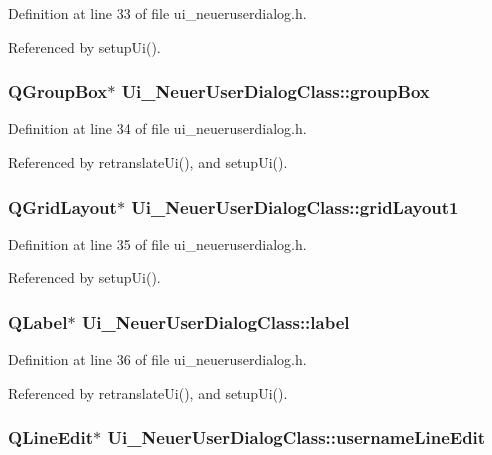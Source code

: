 Definition at line 33 of file ui\_\-neueruserdialog.h.

Referenced by setupUi().\hypertarget{class_ui___neuer_user_dialog_class_b9f51227b66d41b825f04bfccdf9168f}{
\subsubsection[groupBox]{\setlength{\rightskip}{0pt plus 5cm}QGroupBox$\ast$ {\bf Ui\_\-NeuerUserDialogClass::groupBox}}}
\label{class_ui___neuer_user_dialog_class_b9f51227b66d41b825f04bfccdf9168f}




Definition at line 34 of file ui\_\-neueruserdialog.h.

Referenced by retranslateUi(), and setupUi().\hypertarget{class_ui___neuer_user_dialog_class_3b009c5e5d66cae9e5ef400042efbcd2}{
\subsubsection[gridLayout1]{\setlength{\rightskip}{0pt plus 5cm}QGridLayout$\ast$ {\bf Ui\_\-NeuerUserDialogClass::gridLayout1}}}
\label{class_ui___neuer_user_dialog_class_3b009c5e5d66cae9e5ef400042efbcd2}




Definition at line 35 of file ui\_\-neueruserdialog.h.

Referenced by setupUi().\hypertarget{class_ui___neuer_user_dialog_class_58e8d47ef6b5082b660690563d9ab42a}{
\subsubsection[label]{\setlength{\rightskip}{0pt plus 5cm}QLabel$\ast$ {\bf Ui\_\-NeuerUserDialogClass::label}}}
\label{class_ui___neuer_user_dialog_class_58e8d47ef6b5082b660690563d9ab42a}




Definition at line 36 of file ui\_\-neueruserdialog.h.

Referenced by retranslateUi(), and setupUi().\hypertarget{class_ui___neuer_user_dialog_class_ee98382add2320120c64b7c1ac79e4dc}{
\subsubsection[usernameLineEdit]{\setlength{\rightskip}{0pt plus 5cm}QLineEdit$\ast$ {\bf Ui\_\-NeuerUserDialogClass::usernameLineEdit}}}
\label{class_ui___neuer_user_dialog_class_ee98382add2320120c64b7c1ac79e4dc}




